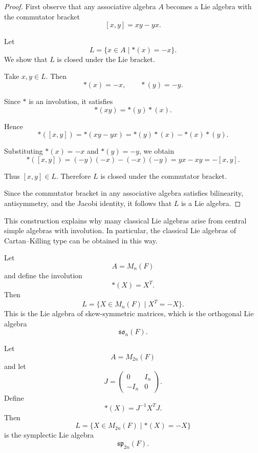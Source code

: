 \documentclass[11pt, a4paper]{report}
\begin{document}
    \begin{proof}
    First observe that any associative algebra $A$ becomes a Lie algebra
    with the commutator bracket
    \[
    [x,y]=xy-yx .
    \]
    
    Let
    \[
    L=\{x\in A\mid *(x)=-x\}.
    \]
    We show that $L$ is closed under the Lie bracket.
    
    Take $x,y\in L$. Then
    \[
    *(x)=-x,\qquad *(y)=-y.
    \]
    
    Since $*$ is an involution, it satisfies
    \[
    *(xy)=*(y)*(x).
    \]
    
    Hence
    \[
    *([x,y])
    =*(xy-yx)
    =*(y)*(x)-*(x)*(y).
    \]
    
    Substituting $*(x)=-x$ and $*(y)=-y$, we obtain
    \[
    *([x,y])
    =(-y)(-x)-(-x)(-y)
    =yx-xy
    =-[x,y].
    \]
    
    Thus $[x,y]\in L$. Therefore $L$ is closed under the commutator bracket.
    
    Since the commutator bracket in any associative algebra satisfies
    bilinearity, antisymmetry, and the Jacobi identity,
    it follows that $L$ is a Lie algebra.
    \end{proof}

    This construction explains why many classical Lie algebras arise from
    central simple algebras with involution.  In particular, the classical
    Lie algebras of Cartan--Killing type can be obtained in this way.
    
    \begin{example}
    Let
    \[
    A=M_n(F)
    \]
    and define the involution
    \[
    *(X)=X^{T}.
    \]
    Then
    \[
    L=\{X\in M_n(F)\mid X^T=-X\}.
    \]
    This is the Lie algebra of skew-symmetric matrices, which is the
    orthogonal Lie algebra
    \[
    \mathfrak{so}_n(F).
    \]
    \end{example}
    
    \begin{example}
    Let
    \[
    A=M_{2n}(F)
    \]
    and let
    \[
    J=
    \begin{pmatrix}
    0 & I_n\\
    -I_n & 0
    \end{pmatrix}.
    \]
    Define
    \[
    *(X)=J^{-1}X^{T}J.
    \]
    Then
    \[
    L=\{X\in M_{2n}(F)\mid *(X)=-X\}
    \]
    is the symplectic Lie algebra
    \[
    \mathfrak{sp}_{2n}(F).
    \]
    \end{example}
    
\end{document}

